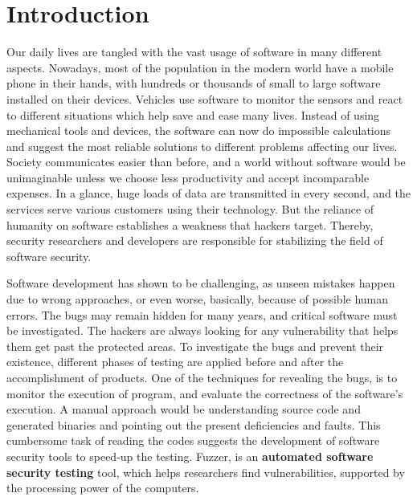 \section{Introduction}
\label{sec:intro}


Our daily lives are tangled with the vast usage of software in many different aspects. Nowadays, most of the population in the modern world have a mobile phone in their hands, with hundreds or thousands of small to large software installed on their devices. Vehicles use software to monitor the sensors and react to different situations which help save and ease many lives. Instead of using mechanical tools and devices, the software can now do impossible calculations and suggest the most reliable solutions to different problems affecting our lives. Society communicates easier than before, and a world without software would be unimaginable unless we choose less productivity and accept incomparable expenses. In a glance, huge loads of data are transmitted in every second, and the services serve various customers using their technology. But the reliance of humanity on software establishes a weakness that hackers target. Thereby, security researchers and developers are responsible for stabilizing the field of software security.


Software development has shown to be challenging, as unseen mistakes happen due to wrong approaches, or even worse, basically, because of possible human  errors. The bugs may remain hidden for many years, and critical software must be investigated. The hackers are always looking for any vulnerability that helps them get past the protected areas. To investigate the bugs and prevent their existence, different phases of testing are applied before and after the accomplishment of products. One of the techniques for revealing the bugs, is to monitor the execution of program, and evaluate the correctness of the software's execution. A manual approach would be understanding source code and generated binaries and pointing out the present deficiencies and faults. This cumbersome task of reading the codes suggests the development of software security tools to speed-up the testing. Fuzzer, is an \textbf{automated software security testing} tool, which helps researchers find vulnerabilities, supported by the processing power of the computers.